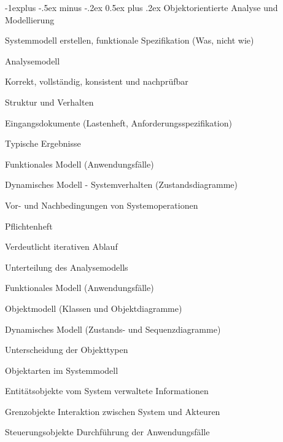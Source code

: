 \documentclass[a4paper]{article}
\makeatletter
\renewcommand{\subsection}{\@startsection{subsection}{2}{0mm}%
                                {-1explus -.5ex minus -.2ex}%
                                {0.5ex plus .2ex}%
                                {\normalfont\normalsize\bfseries}}
\makeatother
\begin{document}
\begin{multicols}{3}
  \subsection{Objektorientierte Analyse und Modellierung}
  \begin{itemize*}
    \item Systemmodell erstellen, funktionale Spezifikation (Was, nicht wie)
    \item Analysemodell
    \begin{itemize*}
      \item Korrekt, vollständig, konsistent und nachprüfbar
      \item Struktur und Verhalten
    \end{itemize*}
    \item Eingangsdokumente (Lastenheft, Anforderungsspezifikation)
    \item Typische Ergebnisse
    \begin{itemize*}
      \item Funktionales Modell (Anwendungsfälle)
      \item Dynamisches Modell - Systemverhalten (Zustandsdiagramme)
      \item Vor- und Nachbedingungen von Systemoperationen
      \item Pflichtenheft
    \end{itemize*}
    \item Verdeutlicht iterativen Ablauf
    \item Unterteilung des Analysemodells
    \begin{itemize*}
      \item Funktionales Modell (Anwendungsfälle)
      \item Objektmodell (Klassen und Objektdiagramme)
      \item Dynamisches Modell (Zustands- und Sequenzdiagramme)
      \item Unterscheidung der Objekttypen
    \end{itemize*}
  \item Objektarten im Systemmodell
  \begin{description*}
    \item[Entitätsobjekte] vom System verwaltete Informationen
    \item[Grenzobjekte] Interaktion zwischen System und Akteuren
    \item[Steuerungsobjekte] Durchführung der Anwendungsfälle

\end{description*}
\end{itemize*}
\end{multicols}
\end{document}
